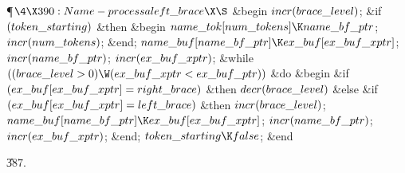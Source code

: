 \Y\P$\4\X390:Name-process a \\{left\_brace}\X\S$\6
\&{begin} $\\{incr}(\\{brace\_level})$;\6
\&{if} $(\\{token\_starting})$ \1\&{then}\6
\&{begin} $\\{name\_tok}[\\{num\_tokens}]\K\\{name\_bf\_ptr}$;\5
$\\{incr}(\\{num\_tokens})$;\6
\&{end};\2\6
$\\{name\_buf}[\\{name\_bf\_ptr}]\K\\{ex\_buf}[\\{ex\_buf\_xptr}]$;\5
$\\{incr}(\\{name\_bf\_ptr})$;\5
$\\{incr}(\\{ex\_buf\_xptr})$;\6
\&{while} $((\\{brace\_level}>0)\W(\\{ex\_buf\_xptr}<\\{ex\_buf\_ptr}))$ \1%
\&{do}\6
\&{begin} \&{if} $(\\{ex\_buf}[\\{ex\_buf\_xptr}]=\\{right\_brace})$ \1%
\&{then}\5
$\\{decr}(\\{brace\_level})$\6
\4\&{else} \&{if} $(\\{ex\_buf}[\\{ex\_buf\_xptr}]=\\{left\_brace})$ \1\&{then}%
\5
$\\{incr}(\\{brace\_level})$;\2\2\6
$\\{name\_buf}[\\{name\_bf\_ptr}]\K\\{ex\_buf}[\\{ex\_buf\_xptr}]$;\5
$\\{incr}(\\{name\_bf\_ptr})$;\5
$\\{incr}(\\{ex\_buf\_xptr})$;\6
\&{end};\2\6
$\\{token\_starting}\K\\{false}$;\6
\&{end}\par
\U387.\fi

